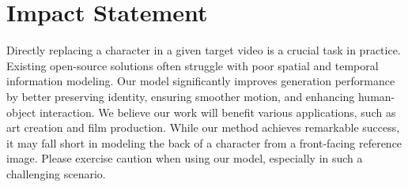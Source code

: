 \section{Impact Statement}


Directly replacing a character in a given target video is a crucial task in practice. Existing open-source solutions often struggle with poor spatial and temporal information modeling. Our model significantly improves generation performance by better preserving identity, ensuring smoother motion, and enhancing human-object interaction. We believe our work will benefit various applications, such as art creation and film production.
While our method achieves remarkable success, it may fall short in modeling the back of a character from a front-facing reference image. Please exercise caution when using our model, especially in such a challenging scenario.
